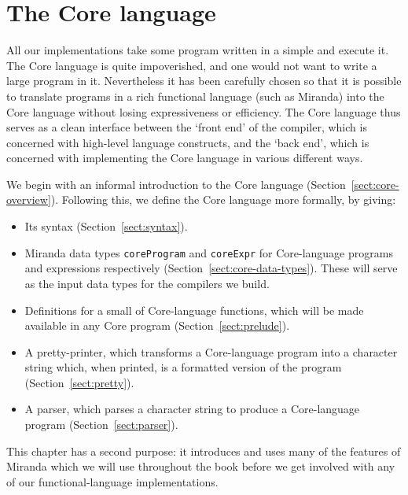 \chapter{The Core language}
\label{sect:language}

All our implementations take some program written in a simple
 and execute it.
The Core language is quite impoverished, and one would not want to
write a large program in it.  Nevertheless it has been carefully
chosen so that it is possible to translate programs in a rich
functional language (such as Miranda) into the Core language without losing
expressiveness or efficiency.  The Core language thus serves as a
clean interface between the `front end'
of the compiler, which is
concerned with high-level language constructs, and the
`back end',
which is concerned with implementing the Core language in various different
ways.

We begin with an informal introduction to the Core language
(Section~\ref{sect:core-overview}).
Following this, we define the Core language more formally, by giving:
\begin{itemize}
\item
Its syntax (Section~\ref{sect:syntax}).
\item
Miranda data types \mbox{\tt coreProgram} and \mbox{\tt coreExpr} for Core-language programs and
expressions respectively (Section~\ref{sect:core-data-types}).
These will serve as the input data types for
the compilers we build.
\item
Definitions for a small  of Core-language functions,
which will be made available in any Core program (Section~\ref{sect:prelude}).
\item
A pretty-printer,
which transforms a Core-language program into a
character string which, when printed, is a formatted version of the
program (Section~\ref{sect:pretty}).
\item
A parser, which parses
a character string to produce a Core-language program
(Section~\ref{sect:parser}).
\end{itemize}
This chapter has a second purpose: it introduces and uses many of the features
of Miranda which we will use throughout the book before we get involved
with any of our functional-language implementations.

